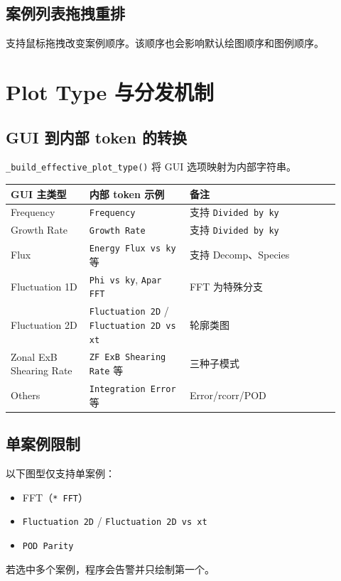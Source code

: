 \documentclass[11pt,a4paper]{ctexart}
\begin{document}
\subsection{案例列表拖拽重排}
支持鼠标拖拽改变案例顺序。该顺序也会影响默认绘图顺序和图例顺序。

\section{Plot Type 与分发机制}
\subsection{GUI 到内部 token 的转换}
\texttt{\_build\_effective\_plot\_type()} 将 GUI 选项映射为内部字符串。

\begin{longtable}{p{0.22\linewidth} p{0.28\linewidth} p{0.42\linewidth}}
\toprule
GUI 主类型 & 内部 token 示例 & 备注 \\
\midrule
\endhead
Frequency & \texttt{Frequency} & 支持 \texttt{Divided by ky} \\
Growth Rate & \texttt{Growth Rate} & 支持 \texttt{Divided by ky} \\
Flux & \texttt{Energy Flux vs ky} 等 & 支持 Decomp、Species \\
Fluctuation 1D & \texttt{Phi vs ky}, \texttt{Apar FFT} & FFT 为特殊分支 \\
Fluctuation 2D & \texttt{Fluctuation 2D} / \texttt{Fluctuation 2D vs xt} & 轮廓类图 \\
Zonal ExB Shearing Rate & \texttt{ZF ExB Shearing Rate} 等 & 三种子模式 \\
Others & \texttt{Integration Error} 等 & Error/rcorr/POD \\
\bottomrule
\end{longtable}

\subsection{单案例限制}
以下图型仅支持单案例：
\begin{itemize}
  \item FFT（\texttt{* FFT}）
  \item \texttt{Fluctuation 2D} / \texttt{Fluctuation 2D vs xt}
  \item \texttt{POD Parity}
\end{itemize}
若选中多个案例，程序会告警并只绘制第一个。
\end{document}
